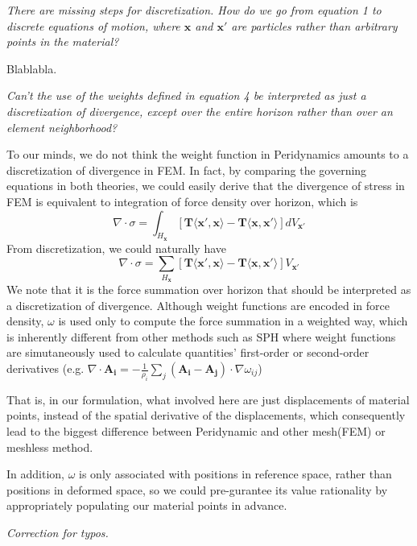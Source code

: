 \emph{There are missing steps for discretization. How do we go from equation 1 to discrete equations of motion, where $\mathbf{x}$ and $\mathbf{x'}$ are particles rather than arbitrary points in the material? }

Blablabla.

\emph{Can't the use of the weights defined in equation 4 be interpreted as just a discretization of divergence, except over the entire horizon rather than over an element neighborhood?}

To our minds, we do not think the weight function in Peridynamics amounts to a discretization of divergence in FEM.
In fact, by comparing the governing equations in both theories, we could easily derive that
the divergence of stress in FEM is equivalent to integration of force density over horizon, which is
\begin{equation}
\nabla\cdot\sigma = \int_{H_\mathbf{x}}[\mathbf{T}\langle\mathbf{x}',\mathbf{x}\rangle - \mathbf{T}\langle\mathbf{x},\mathbf{x}'\rangle]dV_{\mathbf{x}'}
\end{equation}
From discretization, we could naturally have
\begin{equation}
\nabla\cdot\sigma = \sum_{H_\mathbf{x}}[\mathbf{T}\langle\mathbf{x}',\mathbf{x}\rangle - \mathbf{T}\langle\mathbf{x},\mathbf{x}'\rangle]V_{\mathbf{x}'}
\end{equation}
We note that it is the force summation over horizon that should be interpreted as a discretization of divergence.
Although weight functions are encoded in force density, $\omega$ is used only to compute the force summation in a weighted way, which is inherently different from other methods such as SPH where weight functions are simutaneously used to calculate quantities' first-order or second-order derivatives
(e.g. $\nabla\cdot\mathbf{A_i} = -\frac{1}{\rho_i}\sum_j(\mathbf{A_i - A_j})\cdot\nabla\omega_{ij}$)

That is, in our formulation, what involved here are just displacements of material points,
instead of the spatial derivative of the displacements, which consequently lead to the biggest difference between Peridynamic and other mesh(FEM) or meshless method.

In addition, $\omega$ is only associated with positions in reference space, rather than positions in deformed space,
so we could pre-gurantee its value rationality by appropriately populating our material points in advance.

\emph{Correction for typos.}

